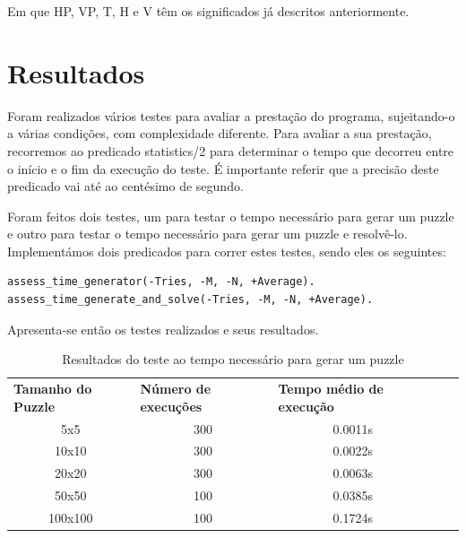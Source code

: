 \documentclass[runningheads,a4paper]{llncs}
\begin{document}
Em que HP, VP, T, H e V têm os significados já descritos anteriormente.

\section{Resultados}

Foram realizados vários testes para avaliar a prestação do programa, sujeitando-o a várias condições, com complexidade diferente. Para avaliar a sua prestação, recorremos ao predicado statistics/2 para determinar o tempo que decorreu entre o início e o fim da execução do teste. É importante referir que a precisão deste predicado vai até ao centésimo de segundo.

Foram feitos dois testes, um para testar o tempo necessário para gerar um puzzle e outro para testar o tempo necessário para gerar um puzzle e resolvê-lo. Implementámos dois predicados para correr estes testes, sendo eles os seguintes:

\begin{lstlisting}
assess_time_generator(-Tries, -M, -N, +Average).
assess_time_generate_and_solve(-Tries, -M, -N, +Average).
\end{lstlisting}

Apresenta-se então os testes realizados e seus resultados.

\begin{table}[]
\begin{tabular}{cccll}
\multicolumn{1}{l}{\textbf{Tamanho do Puzzle}} & \multicolumn{1}{l}{\textbf{Número de execuções}} & \multicolumn{1}{l}{\textbf{Tempo médio de execução}} &  &  \\
5x5                                            & 300                                              & 0.0011s                                               &  &  \\
10x10                                          & 300                                              & 0.0022s                                               &  &  \\
20x20                                          & 300                                              & 0.0063s                                               &  &  \\
50x50                                          & 100                                              & 0.0385s                                               &  &  \\
100x100                                        & 100                                               & 0.1724s                                               &  & 
\end{tabular}
\caption{Resultados do teste ao tempo necessário para gerar um puzzle}
\end{table}
\end{document}
